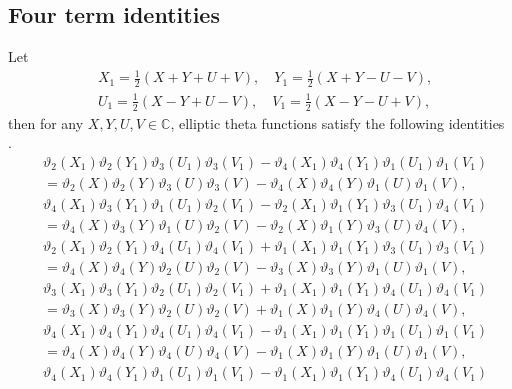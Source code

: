 \documentclass[10pt,leqno]{amsart}
\numberwithin{equation}{section}
\begin{document}
\subsection{Four term identities}
Let
\begin{equation}
\begin{split}
&X_1=\frac{1}{2}(X+Y+U+V),\quad Y_1=\frac{1}{2}(X+Y-U-V),\\
&U_1=\frac{1}{2}(X-Y+U-V),\quad V_1=\frac{1}{2}(X-Y-U+V),
\end{split}
\end{equation}
then for any $X, Y, U, V\in\mathbb{C}$, elliptic theta functions satisfy the following identities \cite{Mumford:Tata_I,Khachev_Zabrodin:theta}.
\begin{align}
&\vartheta_2(X_1)\vartheta_2(Y_1)\vartheta_3(U_1)\vartheta_3(V_1)-\vartheta_4(X_1)\vartheta_4(Y_1)\vartheta_1(U_1)\vartheta_1(V_1)\label{pr4-1}\\
&=\vartheta_2(X)\vartheta_2(Y)\vartheta_3(U)\vartheta_3(V)-\vartheta_4(X)\vartheta_4(Y)\vartheta_1(U)\vartheta_1(V),\nonumber\\
&\vartheta_4(X_1)\vartheta_3(Y_1)\vartheta_1(U_1)\vartheta_2(V_1)-\vartheta_2(X_1)\vartheta_1(Y_1)\vartheta_3(U_1)\vartheta_4(V_1)\label{pr4-2}\\
&=\vartheta_4(X)\vartheta_3(Y)\vartheta_1(U)\vartheta_2(V)-\vartheta_2(X)\vartheta_1(Y)\vartheta_3(U)\vartheta_4(V),\nonumber\\
&\vartheta_2(X_1)\vartheta_2(Y_1)\vartheta_4(U_1)\vartheta_4(V_1)+\vartheta_1(X_1)\vartheta_1(Y_1)\vartheta_3(U_1)\vartheta_3(V_1)\label{pr4-3}\\
&=\vartheta_4(X)\vartheta_4(Y)\vartheta_2(U)\vartheta_2(V)-\vartheta_3(X)\vartheta_3(Y)\vartheta_1(U)\vartheta_1(V),\nonumber\\
&\vartheta_3(X_1)\vartheta_3(Y_1)\vartheta_2(U_1)\vartheta_2(V_1)+\vartheta_1(X_1)\vartheta_1(Y_1)\vartheta_4(U_1)\vartheta_4(V_1)\label{pr4-3-1}\\
&=\vartheta_3(X)\vartheta_3(Y)\vartheta_2(U)\vartheta_2(V)+\vartheta_1(X)\vartheta_1(Y)\vartheta_4(U)\vartheta_4(V),\nonumber\\
&\vartheta_4(X_1)\vartheta_4(Y_1)\vartheta_4(U_1)\vartheta_4(V_1)-\vartheta_1(X_1)\vartheta_1(Y_1)\vartheta_1(U_1)\vartheta_1(V_1)\label{pr4-3-2}\\
&=\vartheta_4(X)\vartheta_4(Y)\vartheta_4(U)\vartheta_4(V)-\vartheta_1(X)\vartheta_1(Y)\vartheta_1(U)\vartheta_1(V),\nonumber\\
&\vartheta_4(X_1)\vartheta_4(Y_1)\vartheta_1(U_1)\vartheta_1(V_1)-\vartheta_1(X_1)\vartheta_1(Y_1)\vartheta_4(U_1)\vartheta_4(V_1)\label{pr4-3-3}\\

\end{align}
\end{document}
